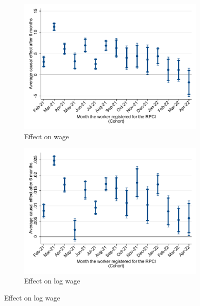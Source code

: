\documentclass[oneside,11pt]{article}
\begin{document}
\begin{figure}[H]
\begin{center}
    \begin{subfigure}{0.49\textwidth}
    \caption{Effect on wage}
    \includegraphics[width=\textwidth]{04_Figures/muestra_10porciento/twfe_beta_cohort_sal_cierre_6m.pdf}
    \end{subfigure}
    \begin{subfigure}{0.49\textwidth}
    \caption{Effect on log wage}
    \includegraphics[width=\textwidth]{04_Figures/muestra_10porciento/twfe_beta_cohort_log_sal_cierre_6m.pdf}
    \end{subfigure}
    
    \end{center}
\end{figure}
\end{document}
